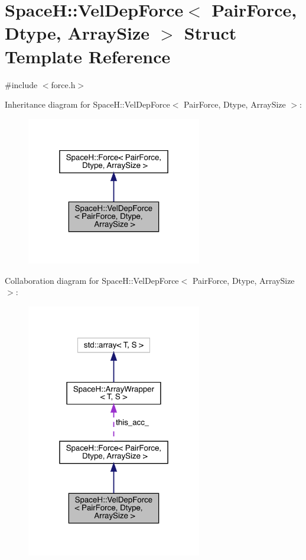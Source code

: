 \hypertarget{struct_space_h_1_1_vel_dep_force}{}\section{SpaceH\+:\+:Vel\+Dep\+Force$<$ Pair\+Force, Dtype, Array\+Size $>$ Struct Template Reference}
\label{struct_space_h_1_1_vel_dep_force}


{\ttfamily \#include $<$force.\+h$>$}



Inheritance diagram for SpaceH\+:\+:Vel\+Dep\+Force$<$ Pair\+Force, Dtype, Array\+Size $>$\+:\nopagebreak
\begin{figure}[H]
\begin{center}
\leavevmode
\includegraphics[width=217pt]{struct_space_h_1_1_vel_dep_force__inherit__graph}
\end{center}
\end{figure}


Collaboration diagram for SpaceH\+:\+:Vel\+Dep\+Force$<$ Pair\+Force, Dtype, Array\+Size $>$\+:\nopagebreak
\begin{figure}[H]
\begin{center}
\leavevmode
\includegraphics[width=217pt]{struct_space_h_1_1_vel_dep_force__coll__graph}
\end{center}
\end{figure}
